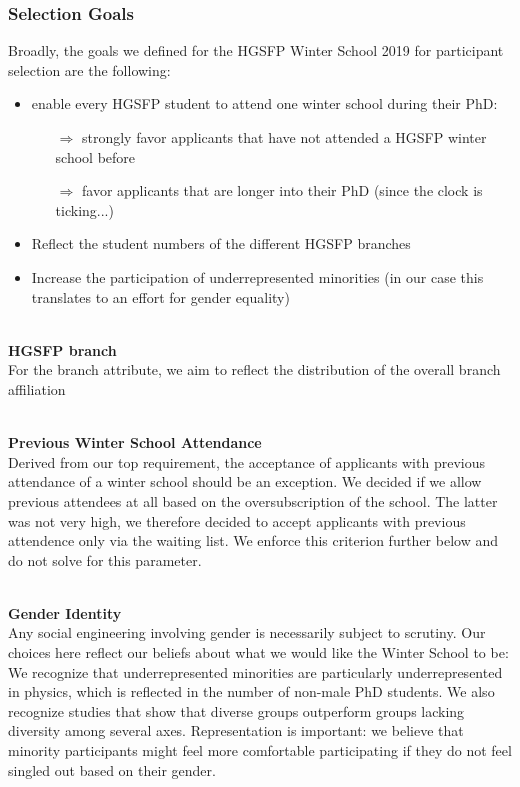 \subsubsection*{Selection Goals}
Broadly, the goals we defined for the HGSFP Winter School 2019 for participant selection are the following:
\begin{itemize}
	\item enable every HGSFP student to attend one winter school during their PhD:
	\begin{itemize}
		\item[$\Rightarrow$] strongly favor applicants that have not attended a HGSFP winter school before
		\item[$\Rightarrow$] favor applicants that are longer into their PhD (since the clock is ticking...)
	\end{itemize}
	\item Reflect the student numbers of the different HGSFP branches
	\item Increase the participation of underrepresented minorities (in our case this translates to an effort for gender equality)
\end{itemize}
~\\
\textbf{HGSFP branch}\\
For the branch attribute, we aim to reflect the distribution of the overall branch affiliation

~\\
\textbf{Previous Winter School Attendance}\\
Derived from our top requirement, the acceptance of applicants with previous attendance of a winter school should be an exception. We decided if we allow previous attendees at all based on the oversubscription of the school. The latter was not very high, we therefore decided to accept applicants with previous attendence only via the waiting list. We enforce this criterion further below and do not solve for this parameter.

~\\
\textbf{Gender Identity}\\
Any social engineering involving gender is necessarily subject to scrutiny. Our choices here reflect our beliefs about what we would like the Winter School to be: We recognize that underrepresented minorities are particularly underrepresented in physics, which is reflected in the number of non-male PhD students. We also recognize studies that show that diverse groups outperform groups lacking diversity among several axes. Representation is important: we believe that minority participants might feel more comfortable participating if they do not feel singled out based on their gender.

